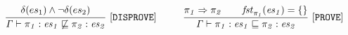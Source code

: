  \begin{gather*}
\frac{
\begin{matrix}
\text{\codeme{\delta(\es_1) \wedge \neg \delta(\es_2) }}
\end{matrix}
}{\text{\code{\Gamma  \vdash  \pi_1 : \es_1 \not\CONTAIN  \pi_2 : \es_2 }}}\ \codeme{  [DISPROVE]} 
\qquad\ \ 
\frac{
\begin{matrix}
\text{\code{\pi_1 \Rightarrow \pi_2 \quad\ \  
\m{fst}_{\pi_1}(\es_1) = \{\}
}}
\end{matrix}
}{\text{\code{\Gamma   \vdash  \pi_1 : \es_1 \CONTAIN  \pi_2 : \es_2 }}}\ \codeme{  [PROVE]} 
\end{gather*}